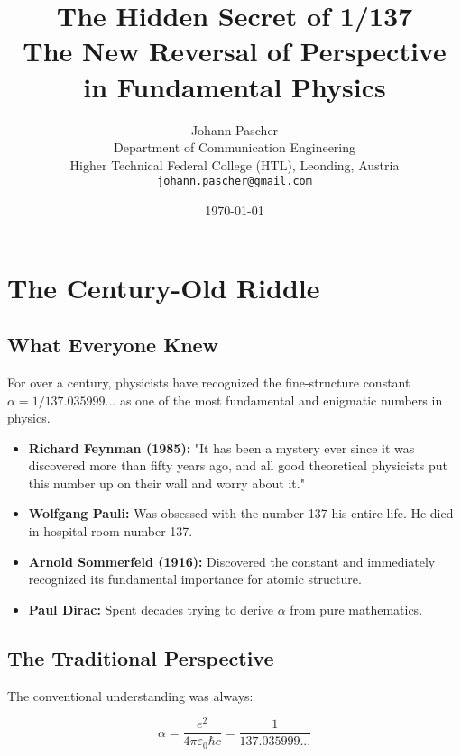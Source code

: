 \documentclass[12pt,a4paper]{article}
\title{
	\textbf{The Hidden Secret of 1/137}\\
	\vspace{0.5cm}
	\Large The New Reversal of Perspective in Fundamental Physics
}
\author{Johann Pascher\\
	Department of Communication Engineering\\
	Higher Technical Federal College (HTL), Leonding, Austria\\
	\texttt{johann.pascher@gmail.com}}
\date{\today}
\theoremstyle{definition}
\begin{document}
	
	\maketitle
	\thispagestyle{empty}
	\newpage
	
	\tableofcontents
	\newpage
	
	\section{The Century-Old Riddle}
	
	\subsection{What Everyone Knew}
	
	For over a century, physicists have recognized the fine-structure constant $\alpha = 1/137.035999...$ as one of the most fundamental and enigmatic numbers in physics.
	
	\begin{fundamental}
		\begin{itemize}
			\item \textbf{Richard Feynman (1985):} "It has been a mystery ever since it was discovered more than fifty years ago, and all good theoretical physicists put this number up on their wall and worry about it."
			
			\item \textbf{Wolfgang Pauli:} Was obsessed with the number 137 his entire life. He died in hospital room number 137.
			
			\item \textbf{Arnold Sommerfeld (1916):} Discovered the constant and immediately recognized its fundamental importance for atomic structure.
			
			\item \textbf{Paul Dirac:} Spent decades trying to derive $\alpha$ from pure mathematics.
		\end{itemize}
	\end{fundamental}
	
	\subsection{The Traditional Perspective}
	
	The conventional understanding was always:
	
	\begin{equation}
		\alpha = \frac{e^2}{4\pi\varepsilon_0\hbar c} = \frac{1}{137.035999...}
	\end{equation}
	
\end{document}
